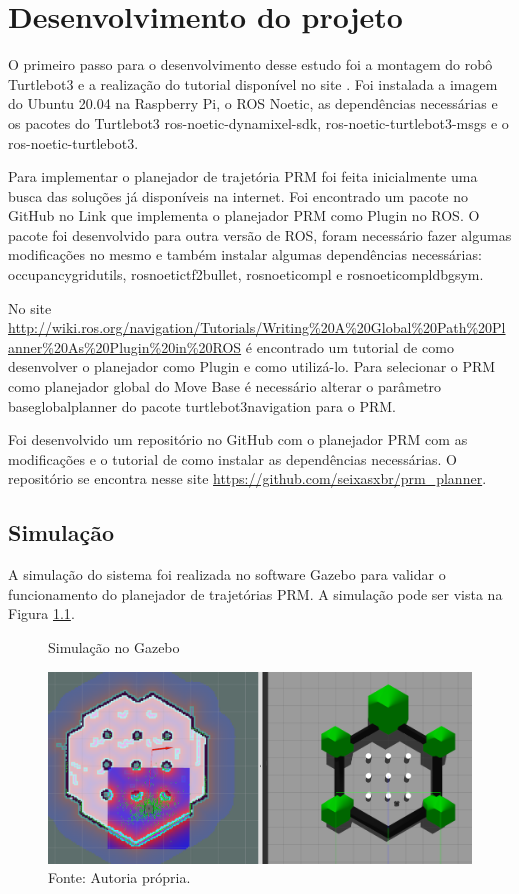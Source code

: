 \chapter{Desenvolvimento do projeto}
\label{chap:metod}
O primeiro passo para o desenvolvimento desse estudo foi a montagem do robô Turtlebot3 e a realização do tutorial disponível no site \cite{ROBOTIS}. Foi instalada a imagem do Ubuntu 20.04 na Raspberry Pi, o ROS Noetic, as dependências necessárias e os pacotes do Turtlebot3 ros-noetic-dynamixel-sdk, ros-noetic-turtlebot3-msgs e o ros-noetic-turtlebot3.

Para implementar o planejador de trajetória PRM foi feita inicialmente uma busca das soluções já disponíveis na internet. Foi encontrado um pacote no GitHub no Link \cite{mwswartwout} que implementa o planejador PRM como Plugin no ROS. O pacote foi desenvolvido para outra versão de ROS, foram necessário fazer algumas modificações no mesmo e também instalar algumas dependências necessárias: occupancy\textunderscore grid\textunderscore utils, ros\textunderscore noetic\textunderscore tf2\textunderscore bullet, ros\textunderscore noetic\textunderscore ompl e ros\textunderscore noetic\textunderscore ompl\textunderscore dbgsym.

No site \url{http://wiki.ros.org/navigation/Tutorials/Writing%20A%20Global%20Path%20Planner%20As%20Plugin%20in%20ROS} é encontrado um tutorial de como desenvolver o planejador como Plugin e como utilizá-lo. 
Para selecionar o PRM como planejador global do Move Base é necessário alterar o parâmetro base\textunderscore global\textunderscore planner do pacote turtlebot3\textunderscore navigation para o PRM.

Foi desenvolvido um repositório no GitHub com o planejador PRM com as modificações e o tutorial de como instalar as dependências necessárias. O repositório se encontra nesse site \url{https://github.com/seixasxbr/prm_planner}.

\section{Simulação}

A simulação do sistema foi realizada no software Gazebo para validar o funcionamento do planejador de trajetórias PRM. A simulação pode ser vista na Figura \ref{fig:simu}.

\begin{figure} [h!]	
    \centering
    \caption{Simulação no Gazebo}
    \includegraphics[width=1\textwidth]{Figures/Screenshot from 2021-12-19 12-58-25 (1).png}
    \caption*{Fonte: Autoria própria.}
    \label{fig:simu}
 \end{figure}

